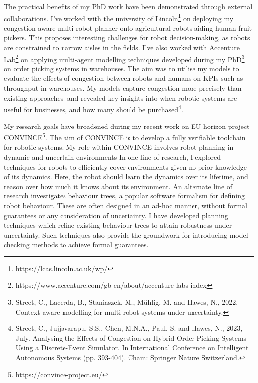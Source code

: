 \documentclass[11pt]{article}
\begin{document}

The practical benefits of my PhD work have been demonstrated through external collaborations.
%
I've worked with the university of Lincoln\footnote{https://lcas.lincoln.ac.uk/wp/} on deploying my congestion-aware multi-robot planner onto agricultural robots aiding human fruit pickers.
%
This proposes interesting challenges for robot decision-making, as robots are constrained to narrow aisles in the fields.
%
I've also worked with Accenture Lab\footnote{https://www.accenture.com/gb-en/about/accenture-labs-index} on applying multi-agent modelling techniques developed during my PhD\footnote{Street, C., Lacerda, B., Staniaszek, M., Mühlig, M. and Hawes, N., 2022. Context-aware modelling for multi-robot systems under uncertainty.} on order picking systems in warehouses.
%
The aim was to utilise my models to evaluate the effects of congestion between robots and humans on KPIs such as throughput in warehouses.
%
My models capture congestion more precisely than existing approaches, and revealed key insights into when robotic systems are useful for businesses, and how many should be purchased\footnote{Street, C., Jujjavarapu, S.S., Chen, M.N.A., Paul, S. and Hawes, N., 2023, July. Analysing the Effects of Congestion on Hybrid Order Picking Systems Using a Discrete-Event Simulator. In International Conference on Intelligent Autonomous Systems (pp. 393-404). Cham: Springer Nature Switzerland.}.


My research goals have broadened during my recent work on EU horizon project CONVINCE\footnote{https://convince-project.eu/}.
%
The aim of CONVINCE is to develop a fully verifiable toolchain for robotic systems.
%
My role within CONVINCE involves robot planning in dynamic and uncertain environments
%
In one line of research, I explored techniques for robots to efficiently cover environments given no prior knowledge of its dynamics.
%
Here, the robot should learn the dynamics over its lifetime, and reason over how much it knows about its environment.
%
An alternate line of research investigates behaviour trees, a popular software formalism for defining robot behaviour.
%
These are often designed in an ad-hoc manner, without formal guarantees or any consideration of uncertainty.
%
I have developed planning techniques which refine existing behaviour trees to attain robustness under uncertainty.
%
Such techniques also provide the groundwork for introducing model checking methods to achieve formal guarantees.
\end{document}
